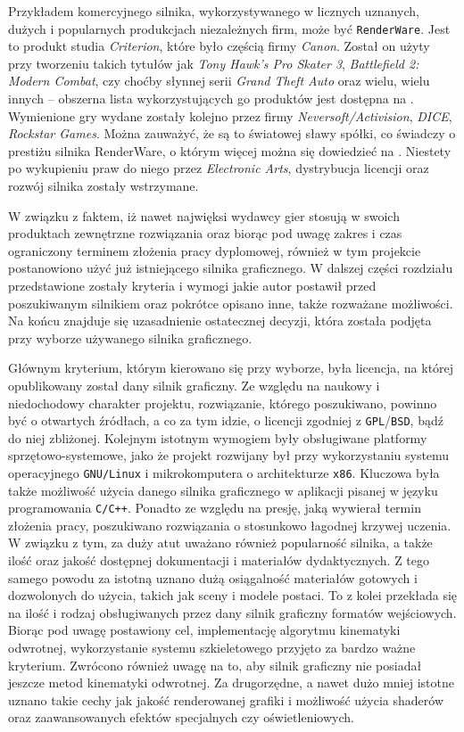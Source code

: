 \documentclass[11pt]{mwrep}
\begin{document}
    Przykładem komercyjnego silnika, wykorzystywanego w licznych uznanych, dużych i popularnych produkcjach niezależnych firm, może być \texttt{RenderWare}. Jest to produkt studia \textit{Criterion}, które było częścią firmy \textit{Canon}. Został on użyty przy tworzeniu takich tytułów jak \textit{Tony Hawk's Pro Skater 3}, \textit{Battlefield 2: Modern Combat}, czy choćby słynnej serii \textit{Grand Theft Auto} oraz wielu, wielu innych -- obszerna lista wykorzystujących go produktów jest dostępna na \cite{renderware:list}. Wymienione gry wydane zostały kolejno przez firmy \textit{Neversoft/Activision}, \textit{DICE}, \textit{Rockstar Games}. Można zauważyć, że są to światowej sławy spółki, co świadczy o prestiżu silnika RenderWare, o którym więcej można się dowiedzieć na \cite{renderware}. Niestety po wykupieniu praw do niego przez \textit{Electronic Arts}, dystrybucja licencji oraz rozwój silnika zostały wstrzymane.


    W związku z faktem, iż nawet najwięksi wydawcy gier stosują w swoich produktach zewnętrzne rozwiązania oraz biorąc pod uwagę zakres i czas ograniczony terminem złożenia pracy dyplomowej, również w tym projekcie postanowiono użyć już istniejącego silnika graficznego. W dalszej części rozdziału przedstawione zostały kryteria i wymogi jakie autor postawił przed poszukiwanym silnikiem oraz pokrótce opisano inne, także rozważane możliwości. Na końcu znajduje się uzasadnienie ostatecznej decyzji, która została podjęta przy wyborze używanego silnika graficznego.


    Głównym kryterium, którym kierowano się przy wyborze, była licencja, na której opublikowany został dany silnik graficzny. Ze względu na naukowy i niedochodowy charakter projektu, rozwiązanie, którego poszukiwano, powinno być o otwartych źródłach, a co za tym idzie, o licencji zgodniej z \texttt{GPL}/\texttt{BSD}, bądź do niej zbliżonej. Kolejnym istotnym wymogiem były obsługiwane platformy sprzętowo-sys\-te\-mo\-we, jako że projekt rozwijany był przy wykorzystaniu systemu operacyjnego \texttt{GNU/Linux} i mikrokomputera o architekturze \texttt{x86}. Kluczowa była także możliwość użycia danego silnika graficznego w aplikacji pisanej w języku programowania \texttt{C/C++}. Ponadto ze względu na presję, jaką wywierał termin złożenia pracy, poszukiwano rozwiązania o stosunkowo łagodnej krzywej uczenia. W związku z tym, za duży atut uważano również popularność silnika, a także ilość oraz jakość dostępnej dokumentacji i materiałów dydaktycznych. Z tego samego powodu za istotną uznano dużą osiągalność materiałów gotowych i dozwolonych do użycia, takich jak sceny i modele postaci. To z kolei przekłada się na ilość i rodzaj obsługiwanych przez dany silnik graficzny formatów wejściowych. Biorąc pod uwagę postawiony cel, implementację algorytmu kinematyki odwrotnej, wykorzystanie systemu szkieletowego przyjęto za bardzo ważne kryterium. Zwrócono również uwagę na to, aby silnik graficzny nie posiadał jeszcze metod kinematyki odwrotnej. Za drugorzędne, a nawet dużo mniej istotne uznano takie cechy jak jakość renderowanej grafiki i możliwość użycia shaderów oraz zaawansowanych efektów specjalnych czy oświetleniowych.
\end{document}
